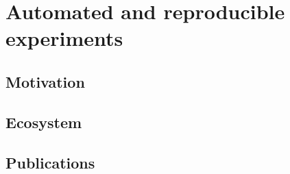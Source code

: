 \chapter{Automated and reproducible experiments} %
\label{cha:automated_and_reproducible_experiments}

\minitoc

\section{Motivation} %
\label{sec:automation_motivation}

\cite{leone2013makesense}
\lipsum


\section{Ecosystem} %
\label{sec:automation_ecosystem}

\lipsum


\section{Publications} %
\label{sec:automated_publications}



